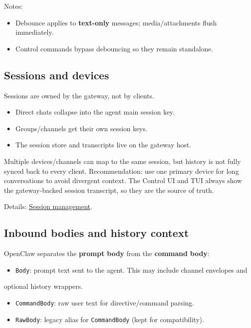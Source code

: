 Notes:

\begin{itemize}
  \item Debounce applies to \textbf{text-only} messages; media/attachments flush immediately.
  \item Control commands bypass debouncing so they remain standalone.
\end{itemize}


\subsection{Sessions and devices}


Sessions are owned by the gateway, not by clients.

\begin{itemize}
  \item Direct chats collapse into the agent main session key.
  \item Groups/channels get their own session keys.
  \item The session store and transcripts live on the gateway host.
\end{itemize}


Multiple devices/channels can map to the same session, but history is not fully
synced back to every client. Recommendation: use one primary device for long
conversations to avoid divergent context. The Control UI and TUI always show the
gateway-backed session transcript, so they are the source of truth.

Details: \href{/concepts/session}{Session management}.

\subsection{Inbound bodies and history context}


OpenClaw separates the \textbf{prompt body} from the \textbf{command body}:

\begin{itemize}
  \item \texttt{Body}: prompt text sent to the agent. This may include channel envelopes and
\end{itemize}

optional history wrappers.
\begin{itemize}
  \item \texttt{CommandBody}: raw user text for directive/command parsing.
  \item \texttt{RawBody}: legacy alias for \texttt{CommandBody} (kept for compatibility).
\end{itemize}


